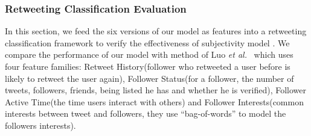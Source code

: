 \documentclass[smallcondensed]{svjour3}     %
\begin{document}
\subsubsection{Retweeting Classification Evaluation}
\label{classifiction}
In this section, we feed the six versions of our model as features into a retweeting classification framework to verify the effectiveness of subjectivity model . 
We compare the performance of our model with method of Luo \emph{et al.}~\cite{Luo:2013RMF} which uses four feature families: Retweet History(follower who retweeted a user before is likely to retweet the user again), Follower Status(for a follower, the number of tweets, followers, friends, being listed he has and whether he is verified), Follower Active Time(the time users interact with others) and Follower Interests(common interests between tweet and followers, they use ``bag-of-words'' to model the followers interests).
\end{document}
